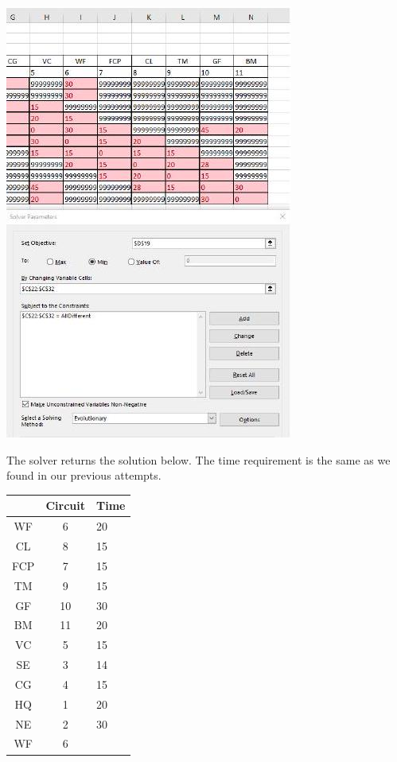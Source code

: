 \documentclass[10pt]{article}
\begin{document}
\includegraphics[max width=\textwidth]{2022_07_05_5945264bba2a5f6ba667g-58(5)}

The solver returns the solution below. The time requirement is the same as we found in our previous attempts.

\begin{tabular}{|c|c|l|}
\cline { 2 - 3 }
 & Circuit & Time \\
\hline
WF & 6 & 20 \\
\hline
CL & 8 & 15 \\
\hline
FCP & 7 & 15 \\
\hline
TM & 9 & 15 \\
\hline
GF & 10 & 30 \\
\hline
BM & 11 & 20 \\
\hline
VC & 5 & 15 \\
\hline
SE & 3 & 14 \\
\hline
CG & 4 & 15 \\
\hline
HQ & 1 & 20 \\
\hline
NE & 2 & 30 \\
\hline
WF & 6 &  \\
\hline
\end{tabular}
\end{document}
